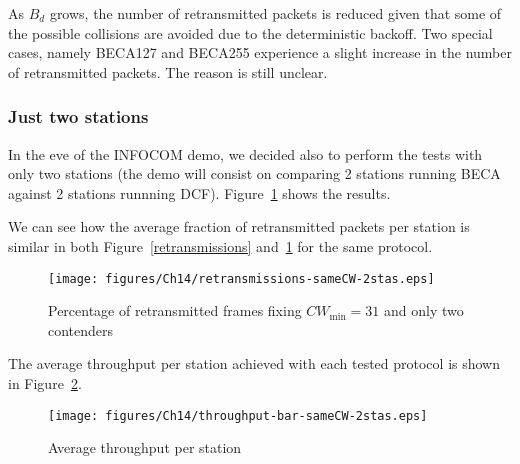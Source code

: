\documentclass[a4paper]{journal}
\begin{document}
	As $B_d$ grows, the number of retransmitted packets is reduced given that some of the possible collisions are avoided due to the deterministic backoff. Two special cases, namely BECA127 and BECA255 experience a slight increase in the number of retransmitted packets. The reason is still unclear.
	
		\subsubsection{Just two stations}
		In the eve of the INFOCOM demo, we decided also to perform the tests with only two stations (the demo will consist on comparing 2 stations running BECA against 2 stations runnning DCF). Figure~\ref{retransmissions-sameCW-2stas} shows the results.
		
		We can see how the average fraction of retransmitted packets per station is similar in both Figure~\ref{retransmissions} and~\ref{retransmissions-sameCW-2stas} for the same protocol.
		
		\begin{figure}[h]
		\centering
			\texttt{[image: figures/Ch14/retransmissions-sameCW-2stas.eps]}
			\caption{Percentage of retransmitted frames fixing $CW_{\min}=31$ and only two contenders}
			\label{retransmissions-sameCW-2stas}
		\end{figure}
		
		The average throughput per station achieved with each tested protocol is shown in Figure~\ref{throughput-2stas}.
		\begin{figure}[h]
		\centering
			\texttt{[image: figures/Ch14/throughput-bar-sameCW-2stas.eps]}
			\caption{Average throughput per station}
			\label{throughput-2stas}
		\end{figure}

		
	


\end{document}
